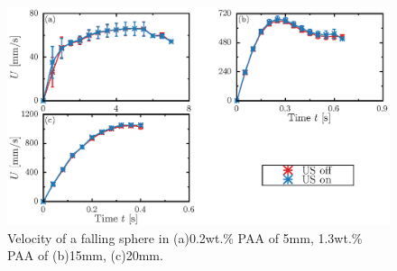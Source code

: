 \begin{figure}[h]
    \centering
    \includegraphics[width=1\textwidth]{X-Appendix/diameter-0.5/diameter.eps}
    \caption{Velocity of a falling sphere in (a)0.2wt.\% PAA of 5mm, 1.3wt.\% PAA of (b)15mm, (c)20mm.}
    \label{fig:diameter-0.2-1.3}
\end{figure}
